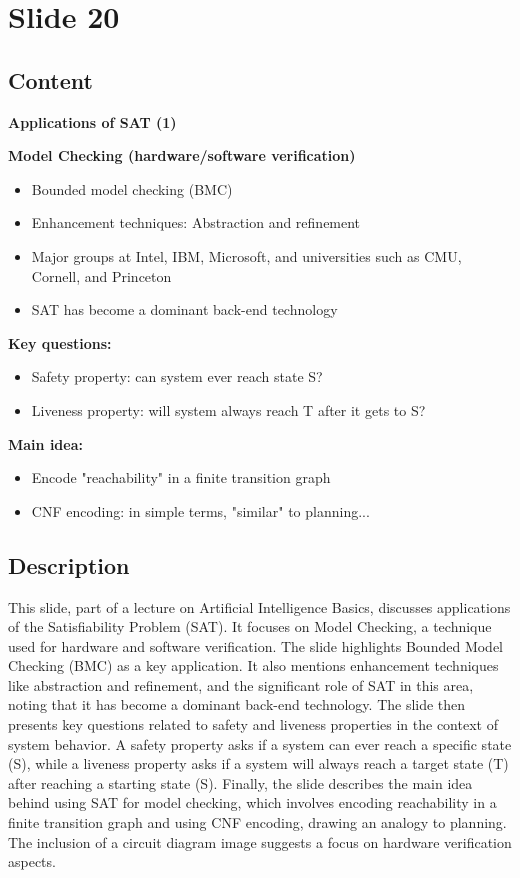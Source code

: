 \documentclass{article}%
\begin{document}
%
\newpage%
\section{Slide 20}%
\label{sec:Slide20}%
\subsection{Content}%

\textbf{Applications of SAT (1)}

\textbf{Model Checking (hardware/software verification)}
\begin{itemize}
    \item Bounded model checking (BMC)
    \item Enhancement techniques: Abstraction and refinement
    \item Major groups at Intel, IBM, Microsoft, and universities such as CMU, Cornell, and Princeton
    \item SAT has become a dominant back-end technology
\end{itemize}

\textbf{Key questions:}
\begin{itemize}
    \item Safety property: can system ever reach state S?
    \item Liveness property: will system always reach T after it gets to S?
\end{itemize}

\textbf{Main idea:}
\begin{itemize}
    \item Encode "reachability" in a finite transition graph
    \item CNF encoding: in simple terms, "similar" to planning...
\end{itemize}
%
\subsection{Description}%
This slide, part of a lecture on Artificial Intelligence Basics, discusses applications of the Satisfiability Problem (SAT).  It focuses on Model Checking, a technique used for hardware and software verification.  The slide highlights Bounded Model Checking (BMC) as a key application.  It also mentions enhancement techniques like abstraction and refinement, and the significant role of SAT in this area, noting that it has become a dominant back-end technology.  The slide then presents key questions related to safety and liveness properties in the context of system behavior.  A safety property asks if a system can ever reach a specific state (S), while a liveness property asks if a system will always reach a target state (T) after reaching a starting state (S).  Finally, the slide describes the main idea behind using SAT for model checking, which involves encoding reachability in a finite transition graph and using CNF encoding, drawing an analogy to planning.  The inclusion of a circuit diagram image suggests a focus on hardware verification aspects.%
\end{document}

